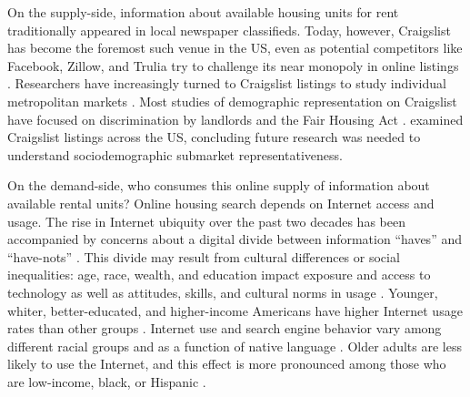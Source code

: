 \documentclass[11pt,letterpaper]{article}
\begin{document}
On the supply-side, information about available housing units for rent traditionally appeared in local newspaper classifieds. Today, however, Craigslist has become the foremost such venue in the US, even as potential competitors like Facebook, Zillow, and Trulia try to challenge its near monopoly in online listings \citep{hau_newspaper_2006,brown_rental_2014,seamans_responses_2014,kroft_does_2014,yurieff_facebook_2017}. Researchers have increasingly turned to Craigslist listings to study individual metropolitan markets \citep[e.g.][]{besbris_language_2018,brown_converting_2017,im_energy_2017,halket_homeownership_2015,mallach_meeting_2010,schachter_immigration_2017,wegmann_understanding_2012}. Most studies of demographic representation on Craigslist have focused on discrimination by landlords \citep[e.g.][]{hanson_field_2014,carlsson_discrimination_2014} and the Fair Housing Act \citep[e.g.][]{larkin_criminal_2010,oliveri_discriminatory_2010}. \citet{boeing_new_2017} examined Craigslist listings across the US, concluding future research was needed to understand sociodemographic submarket representativeness.

On the demand-side, who consumes this online supply of information about available rental units? Online housing search depends on Internet access and usage. The rise in Internet ubiquity over the past two decades has been accompanied by concerns about a digital divide between information \enquote{haves} and \enquote{have-nots} \citep{hersberger_are_2003}. This divide may result from cultural differences or social inequalities: age, race, wealth, and education impact exposure and access to technology as well as attitudes, skills, and cultural norms in usage \citep{jones_u.s._2009,robinson_digital_2015}. Younger, whiter, better-educated, and higher-income Americans have higher Internet usage rates than other groups \citep{porter_using_2006}. Internet use and search engine behavior vary among different racial groups and as a function of native language \citep{slate_digital_2002,weber_who_2011}. Older adults are less likely to use the Internet, and this effect is more pronounced among those who are low-income, black, or Hispanic \citep{choi_digital_2013}.
\end{document}
